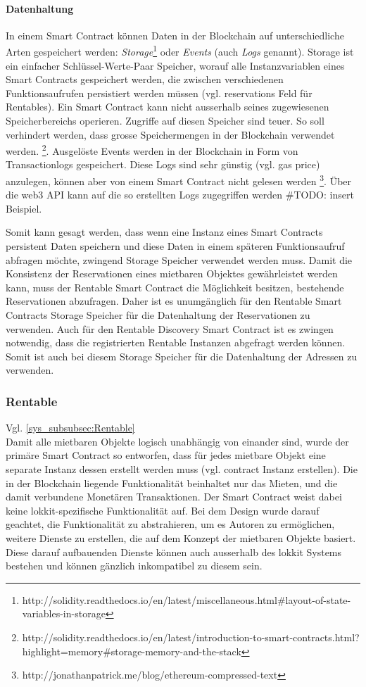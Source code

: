 \paragraph{Datenhaltung}
In einem Smart Contract können Daten in der Blockchain auf unterschiedliche Arten gespeichert werden: \emph{Storage}\footnote{http://solidity.readthedocs.io/en/latest/miscellaneous.html\#layout-of-state-variables-in-storage} oder \emph{Events} (auch \emph{Logs} genannt). Storage ist ein einfacher Schlüssel-Werte-Paar Speicher, worauf alle Instanzvariablen eines Smart Contracts gespeichert werden, die zwischen verschiedenen Funktionsaufrufen persistiert werden müssen (vgl. reservations Feld für Rentables). Ein Smart Contract kann nicht ausserhalb seines zugewiesenen Speicherbereichs operieren. Zugriffe auf diesen Speicher sind teuer. So soll verhindert werden, dass grosse Speichermengen in der Blockchain verwendet werden. \footnote{http://solidity.readthedocs.io/en/latest/introduction-to-smart-contracts.html?highlight=memory\#storage-memory-and-the-stack}. Ausgelöste Events werden in der Blockchain in Form von Transactionlogs gespeichert. Diese Logs sind sehr günstig (vgl. gas price) anzulegen, können aber von einem Smart Contract nicht gelesen werden \footnote{http://jonathanpatrick.me/blog/ethereum-compressed-text}. Über die web3 API kann auf die so erstellten Logs zugegriffen werden \#TODO: insert Beispiel.

Somit kann gesagt werden, dass wenn eine Instanz eines Smart Contracts persistent Daten speichern und diese Daten in einem späteren Funktionsaufruf abfragen möchte, zwingend Storage Speicher verwendet werden muss. Damit die Konsistenz der Reservationen eines mietbaren Objektes gewährleistet werden kann, muss der Rentable Smart Contract die Möglichkeit besitzen, bestehende Reservationen abzufragen. Daher ist es unumgänglich für den Rentable Smart Contracts Storage Speicher für die Datenhaltung der Reservationen zu verwenden. Auch für den Rentable Discovery Smart Contract ist es zwingen notwendig, dass die registrierten Rentable Instanzen abgefragt werden können. Somit ist auch bei diesem Storage Speicher für die Datenhaltung der Adressen zu verwenden.

\subsubsection{Rentable}
\label{subsubsec:Rentable}
Vgl. \ref{sys_subsubsec:Rentable}
\\Damit alle mietbaren Objekte logisch unabhängig von einander sind, wurde der primäre Smart Contract so entworfen, dass für jedes mietbare Objekt eine separate Instanz dessen erstellt werden muss (vgl. contract Instanz erstellen). Die in der Blockchain liegende Funktionalität beinhaltet nur das Mieten, und die damit verbundene Monetären Transaktionen. Der Smart Contract weist dabei keine lokkit-spezifische Funktionalität auf. Bei dem Design wurde darauf geachtet, die Funktionalität zu abstrahieren, um es Autoren zu ermöglichen, weitere Dienste zu erstellen, die auf dem Konzept der mietbaren Objekte basiert. Diese darauf aufbauenden Dienste können auch ausserhalb des lokkit Systems bestehen und können gänzlich inkompatibel zu diesem sein.

